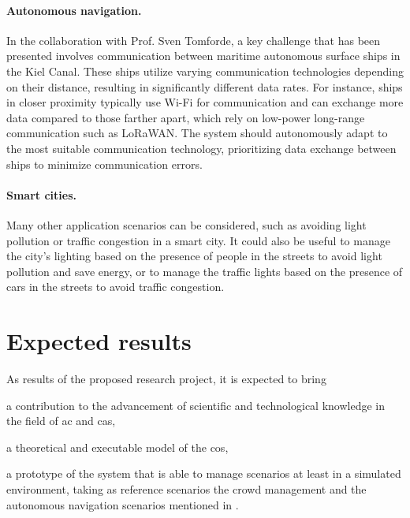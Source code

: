 \documentclass[12pt, a4paper]{article}
\newenvironment{inlinelist}{\begin{enumerate*}[label=\emph{(\roman*)}]}{\end{enumerate*}}
\begin{document}
\sloppypar
\paragraph{Autonomous navigation.}
In the collaboration with Prof. Sven Tomforde,
a key challenge that has been presented involves communication between maritime autonomous surface ships in the Kiel Canal.
%
These ships utilize varying communication technologies depending on their distance,
resulting in significantly different data rates.
%
For instance,
ships in closer proximity typically use Wi-Fi for communication and can exchange more data compared to those farther apart,
which rely on low-power long-range communication such as LoRaWAN.
%
%
The system should autonomously adapt to the most suitable communication technology,
prioritizing data exchange between ships to minimize communication errors.

\sloppypar
\paragraph{Smart cities.}
Many other application scenarios can be considered,
such as avoiding light pollution or traffic congestion in a smart city.
%
It could also be useful to manage the city's lighting based on the presence of people in the streets to avoid light pollution and save energy,
or to manage the traffic lights based on the presence of cars in the streets to avoid traffic congestion.

\section{Expected results}
\label{sec:expected-results}

As results of the proposed research project,
it is expected to bring
\begin{inlinelist}
    \item a contribution to the advancement of scientific and technological knowledge in the field of \ac{ac} and \ac{cas},
    \item a theoretical and executable model of the \ac{cos},
    \item a prototype of the system that is able to manage scenarios at least in a simulated environment,
    taking as reference scenarios the crowd management and the autonomous navigation scenarios mentioned in .
\end{inlinelist}
\end{document}
